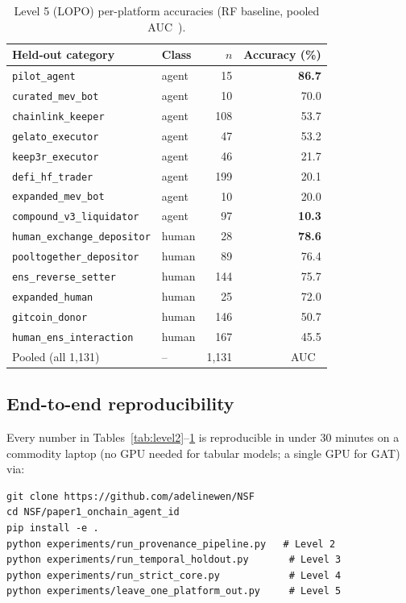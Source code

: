 \documentclass[10pt]{article}
\begin{document}
\begin{table}[h]
\centering
\small
\caption{Level 5 (LOPO) per-platform accuracies (RF baseline, pooled AUC~\lopoRfPooledAuc{}).}
\label{tab:level5}
\begin{tabular}{llrr}
\toprule
Held-out category & Class & $n$ & Accuracy (\%) \\
\midrule
\texttt{pilot\_agent} & agent & 15 & \textbf{86.7} \\
\texttt{curated\_mev\_bot} & agent & 10 & 70.0 \\
\texttt{chainlink\_keeper} & agent & 108 & 53.7 \\
\texttt{gelato\_executor} & agent & 47 & 53.2 \\
\texttt{keep3r\_executor} & agent & 46 & 21.7 \\
\texttt{defi\_hf\_trader} & agent & 199 & 20.1 \\
\texttt{expanded\_mev\_bot} & agent & 10 & 20.0 \\
\texttt{compound\_v3\_liquidator} & agent & 97 & \textbf{10.3} \\
\texttt{human\_exchange\_depositor} & human & 28 & \textbf{78.6} \\
\texttt{pooltogether\_depositor} & human & 89 & 76.4 \\
\texttt{ens\_reverse\_setter} & human & 144 & 75.7 \\
\texttt{expanded\_human} & human & 25 & 72.0 \\
\texttt{gitcoin\_donor} & human & 146 & 50.7 \\
\texttt{human\_ens\_interaction} & human & 167 & 45.5 \\
\midrule
Pooled (all 1{,}131) & -- & 1{,}131 & AUC~\textbf{\lopoRfPooledAuc{}} \\
\bottomrule
\end{tabular}
\end{table}

\subsection{End-to-end reproducibility}

Every number in Tables~\ref{tab:level2}--\ref{tab:level5} is reproducible in under 30 minutes on a commodity laptop (no GPU needed for tabular models; a single GPU for GAT) via:
\begin{verbatim}
git clone https://github.com/adelinewen/NSF
cd NSF/paper1_onchain_agent_id
pip install -e .
python experiments/run_provenance_pipeline.py   # Level 2
python experiments/run_temporal_holdout.py       # Level 3
python experiments/run_strict_core.py            # Level 4
python experiments/leave_one_platform_out.py     # Level 5
\end{verbatim}
\end{document}
